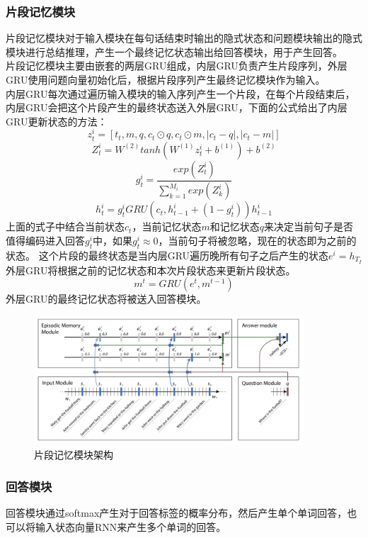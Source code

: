 \subsubsection{片段记忆模块}
片段记忆模块对于输入模块在每句话结束时输出的隐式状态和问题模块输出的隐式模块进行总结推理，产生一个最终记忆状态输出给回答模块，用于产生回答。\\
片段记忆模块主要由嵌套的两层GRU组成，内层GRU负责产生片段序列，外层GRU使用问题向量初始化后，根据片段序列产生最终记忆模块作为输入。\\
内层GRU每次通过遍历输入模块的输入序列产生一个片段，在每个片段结束后，内层GRU会把这个片段产生的最终状态送入外层GRU，下面的公式给出了内层GRU更新状态的方法：\cite{xiong2016dynamic}\\
\begin{equation}
z^i_t = [t_t,m,q,c_t \odot q, c_t \odot m,| c_t - q |,|c_t - m|]
\end{equation}
\begin{equation}
Z^i_t = W^{(2)}tanh(W^{(1)}z^i_t+b^{(1)})+b^{(2)}
\end{equation}
\begin{equation}
g^i_t = \frac{exp(Z^i_t)}{\sum_{k=1}^{M_i}exp(Z^i_k)}
\end{equation}
\begin{equation}
h^i_t = g^i_tGRU(c_t,h^i_{t-1} + (1 - g^i_t))h^i_{t-1}
\end{equation}
上面的式子中结合当前状态$c_t$，当前记忆状态$m$和记忆状态$q$来决定当前句子是否值得编码进入回答$g^i_t$中，如果$g^i_t \approx 0$，当前句子将被忽略，现在的状态即为之前的状态。
这个片段的最终状态是当内层GRU遍历晚所有句子之后产生的状态$e^i = h_{T_I}$\\
外层GRU将根据之前的记忆状态和本次片段状态来更新片段状态。\\
\begin{equation}
m^t = GRU(e^t,m^{t-1})
\end{equation}
外层GRU的最终记忆状态将被送入回答模块。
\begin{figure}[h]
      \centering
        \includegraphics[width=0.9\textwidth]{./images/episodic-memory-structure}
          \caption{片段记忆模块架构}
      \end{figure}
\subsubsection{回答模块}
回答模块通过softmax产生对于回答标签的概率分布，然后产生单个单词回答，也可以将输入状态向量RNN来产生多个单词的回答。